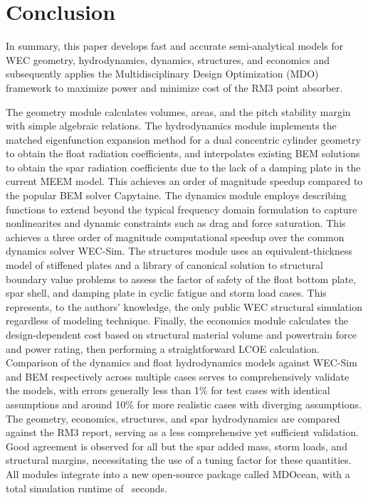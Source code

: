 \documentclass[preprint,12pt]{elsarticle}
\begin{document}


\clearpage

\clearpage

\clearpage

\clearpage

\clearpage

\clearpage

\section{Conclusion}
In summary, this paper develops fast and accurate semi-analytical models for WEC geometry, hydrodynamics, dynamics, structures, and economics and subsequently applies the Multidisciplinary Design Optimization (MDO) framework to maximize power and minimize cost of the RM3 point absorber. 

The geometry module calculates volumes, areas, and the pitch stability margin with simple algebraic relations.
The hydrodynamics module implements the matched eigenfunction expansion method for a dual concentric cylinder geometry to obtain the float radiation coefficients, and interpolates existing BEM solutions to obtain the spar radiation coefficients due to the lack of a damping plate in the current MEEM model.
This achieves an order of magnitude speedup compared to the popular BEM solver Capytaine.
The dynamics module employs describing functions to extend beyond the typical frequency domain formulation to capture nonlinearites and dynamic constraints such as drag and force saturation.
This achieves a three order of magnitude computational speedup over the common dynamics solver WEC-Sim.
The structures module uses an equivalent-thickness model of stiffened plates and a library of canonical solution to structural boundary value problems to assess the factor of safety of the float bottom plate, spar shell, and damping plate in cyclic fatigue and storm load cases.
This represents, to the authors' knowledge, the only public WEC structural simulation regardless of modeling technique.
Finally, the economics module calculates the design-dependent cost based on structural material volume and powertrain force and power rating, then performing a straightforward LCOE calculation.
Comparison of the dynamics and float hydrodynamics models against WEC-Sim and BEM respectively across multiple cases serves to comprehensively validate the models, with errors generally less than 1\% for test cases with identical assumptions and around 10\% for more realistic cases with diverging assumptions.
The geometry, economics, structures, and spar hydrodynamics are compared against the RM3 report, serving as a less comprehensive yet sufficient validation.
Good agreement is observed for all but the spar added mass, storm loads, and structural margins, necessitating the use of a tuning factor for these quantities.
All modules integrate into a new open-source package called MDOcean, with a total simulation runtime of \simRuntime~seconds.
\end{document}
